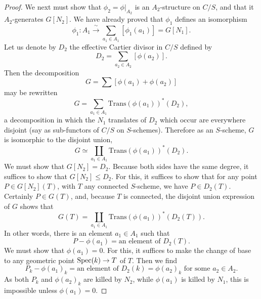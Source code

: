 \begin{proof}
We next must show that $\phi_2 = \phi|_{A_2}$ is an $A_2$-structure on $C/S$, and that it $A_2$-generates $G[N_2]$. We have already proved that $\phi_1$ defines an isomorphism
\[
\phi_1 : A_1 \xrightarrow{\ \sim\ } \sum_{a_1 \in A_1} [\phi_1(a_1)] = G[N_1].
\]
Let us denote by $D_2$ the effective Cartier divisor in $C/S$ defined by
\[
D_2 = \sum_{a_2 \in A_2} [\phi(a_2)].
\]
Then the decomposition
\[
G = \sum [\phi(a_1) + \phi(a_2)]
\]
may be rewritten
\[
G = \sum_{a_1 \in A_1} \mathrm{Trans}(\phi(a_1))^*(D_2),
\]
a decomposition in which the $N_1$ translates of $D_2$ which occur are everywhere disjoint (say as sub-functors of $C/S$ on $S$-schemes). Therefore as an $S$-scheme, $G$ is isomorphic to the disjoint union,
\[
G \simeq \coprod_{a_1 \in A_1} \mathrm{Trans}(\phi(a_1))^*(D_2).
\]
We must show that $G[N_2] = D_2$. Because both sides have the same degree, it suffices to show that $G[N_2] \le D_2$. For this, it suffices to show that for any point $P \in G[N_2](T)$, with $T$ any connected $S$-scheme, we have $P \in D_2(T)$. Certainly $P \in G(T)$, and, because $T$ is connected, the disjoint union expression of $G$ shows that
\[
G(T) = \coprod_{a_1 \in A_1} \mathrm{Trans}(\phi(a_1))^*(D_2(T)).
\]
In other words, there is an element $a_1 \in A_1$ such that
\[
P - \phi(a_1) = \text{an element of } D_2(T).
\]
We must show that $\phi(a_1) = 0$. For this, it suffices to make the change of base to any geometric point $\operatorname{Spec}(k) \to T$ of $T$. Then we find
\[
P_k - \phi(a_1)_k = \text{an element of } D_2(k) = \phi(a_2)_k \text{ for some } a_2 \in A_2.
\]
As both $P_k$ and $\phi(a_2)_k$ are killed by $N_2$, while $\phi(a_1)$ is killed by $N_1$, this is impossible unless $\phi(a_1) = 0$.


\end{proof}
